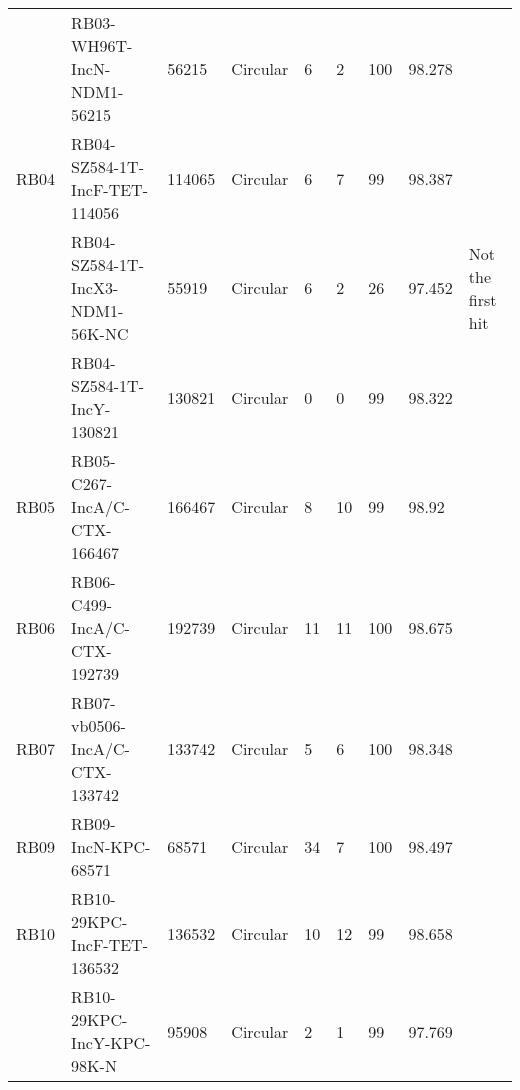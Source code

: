 \documentclass[a4paper,num-refs]{oup-contemporary}
\begin{document}
\begin{landscape}
\begin{table}
\begin{tabularx}{\linewidth}{l l l l l l l l l}
                         & RB03-WH96T-IncN-NDM1-56215         & 56215         & Circular            & 6                                & 2                                        & 100               & 98.278            &                   \\
RB04                     & RB04-SZ584-1T-IncF-TET-114056      & 114065        & Circular            & 6                                & 7                                        & 99                & 98.387            &                   \\
                         & RB04-SZ584-1T-IncX3-NDM1-56K-NC    & 55919         & Circular            & 6                                & 2                                        & 26                & 97.452            & Not the first hit \\
                         & RB04-SZ584-1T-IncY-130821          & 130821        & Circular            & 0                                & 0                                        & 99                & 98.322            &                   \\
RB05                     & RB05-C267-IncA/C-CTX-166467        & 166467        & Circular            & 8                                & 10                                       & 99                & 98.92             &                   \\
RB06                     & RB06-C499-IncA/C-CTX-192739        & 192739        & Circular            & 11                               & 11                                       & 100               & 98.675            &                   \\
RB07                     & RB07-vb0506-IncA/C-CTX-133742      & 133742        & Circular            & 5                                & 6                                        & 100               & 98.348            &                   \\
RB09                     & RB09-IncN-KPC-68571                & 68571         & Circular            & 34                               & 7                                        & 100               & 98.497            &                   \\
RB10                     & RB10-29KPC-IncF-TET-136532         & 136532        & Circular            & 10                               & 12                                       & 99                & 98.658            &                   \\
                         & RB10-29KPC-IncY-KPC-98K-N          & 95908         & Circular            & 2                                & 1                                        & 99                & 97.769            &                   \\

\end{tabularx}
\end{table}
\end{landscape}
\end{document}
